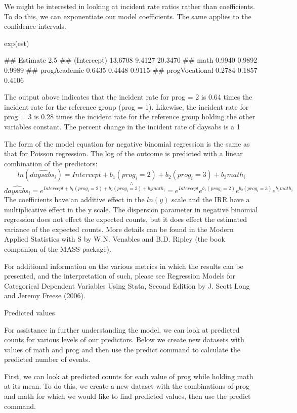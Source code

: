 We might be interested in looking at incident rate ratios rather than coefficients. To do this, we can exponentiate our model coefficients. The same applies to the confidence intervals.



exp(est)

##                Estimate  2.5 %
## (Intercept)     13.6708 9.4127 20.3470
## math             0.9940 0.9892  0.9989
## progAcademic     0.6435 0.4448  0.9115
## progVocational   0.2784 0.1857  0.4106

The output above indicates that the incident rate for prog = 2 is 0.64 times the incident rate for the reference group (prog = 1). Likewise, the incident rate for prog = 3 is 0.28 times the incident rate for the reference group holding the other variables constant. The percent change in the incident rate of daysabs is a 1%

The form of the model equation for negative binomial regression is the same as that for Poisson regression. The log of the outcome is predicted with a linear combination of the predictors:
\[ ln(\widehat{daysabs_i}) = Intercept + b_1(prog_i = 2) + b_2(prog_i = 3) + b_3math_i \] \[ \therefore \] \[ \widehat{daysabs_i} = e^{Intercept + b_1(prog_i = 2) + b_2(prog_i = 3) + b_3math_i} = e^{Intercept}e^{b_1(prog_i = 2)}e^{b_2(prog_i = 3)}e^{b_3math_i} \]
The coefficients have an additive effect in the \(ln(y)\) scale and the IRR have a multiplicative effect in the y scale. The dispersion parameter in negative binomial regression does not effect the expected counts, but it does effect the estimated variance of the expected counts. More details can be found in the Modern Applied Statistics with S by W.N. Venables and B.D. Ripley (the book companion of the MASS package).

For additional information on the various metrics in which the results can be presented, and the interpretation of such, please see Regression Models for Categorical Dependent Variables Using Stata, Second Edition by J. Scott Long and Jeremy Freese (2006).

Predicted values

For assistance in further understanding the model, we can look at predicted counts for various levels of our predictors. Below we create new datasets with values of math and prog and then use the predict command to calculate the predicted number of events.

First, we can look at predicted counts for each value of prog while holding math at its mean. To do this, we create a new dataset with the combinations of prog and math for which we would like to find predicted values, then use the predict command.




